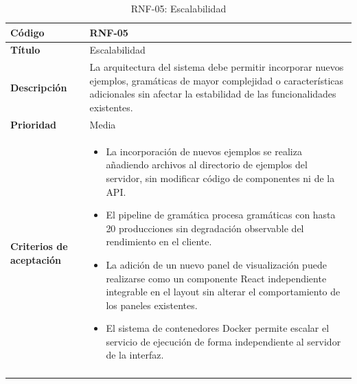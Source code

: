 \begin{longtable}{|>{\bfseries}p{3cm}|p{11cm}|}
\hline
\textbf{Código} & RNF-05 \\
\hline
\textbf{Título} & Escalabilidad \\
\hline
\textbf{Descripción} & La arquitectura del sistema debe permitir incorporar nuevos ejemplos, gramáticas de mayor complejidad o características adicionales sin afectar la estabilidad de las funcionalidades existentes. \\
\hline
\textbf{Prioridad} & Media \\
\hline
\textbf{Criterios de aceptación} &
\begin{itemize}[leftmargin=*,topsep=2pt,itemsep=1pt,parsep=0pt]
    \item La incorporación de nuevos ejemplos se realiza añadiendo archivos al directorio de ejemplos del servidor, sin modificar código de componentes ni de la API.
    \item El pipeline de gramática procesa gramáticas con hasta 20 producciones sin degradación observable del rendimiento en el cliente.
    \item La adición de un nuevo panel de visualización puede realizarse como un componente React independiente integrable en el layout sin alterar el comportamiento de los paneles existentes.
    \item El sistema de contenedores Docker permite escalar el servicio de ejecución de forma independiente al servidor de la interfaz.
\end{itemize} \\
\hline
\caption{RNF-05: Escalabilidad}
\label{tab:rnf05}
\end{longtable}
